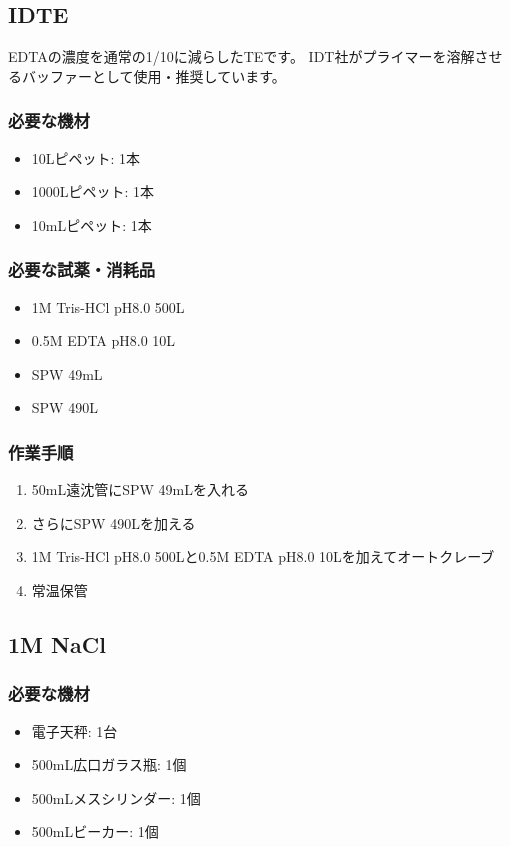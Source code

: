 \documentclass[titlepage,10pt,a4paper,uplatex]{jsbook}
\begin{document}
\subsection{IDTE}

EDTAの濃度を通常の1/10に減らしたTEです。
IDT社がプライマーを溶解させるバッファーとして使用・推奨しています。

\subsubsection{必要な機材}
\begin{itemize}
\item 10{\textmu}Lピペット: 1本
\item 1000{\textmu}Lピペット: 1本
\item 10mLピペット: 1本
\end{itemize}

\subsubsection{必要な試薬・消耗品}
\begin{itemize}
\item 1M Tris-HCl pH8.0 500{\textmu}L
\item 0.5M EDTA pH8.0 10{\textmu}L
\item SPW 49mL
\item SPW 490{\textmu}L
\end{itemize}

\subsubsection{作業手順}
\begin{enumerate}
\item 50mL遠沈管にSPW 49mLを入れる
\item さらにSPW 490{\textmu}Lを加える
\item 1M Tris-HCl pH8.0 500{\textmu}Lと0.5M EDTA pH8.0 10{\textmu}Lを加えてオートクレーブ
\item 常温保管
\end{enumerate}

\subsection{1M NaCl}

\subsubsection{必要な機材}
\begin{itemize}
\item 電子天秤: 1台
\item 500mL広口ガラス瓶: 1個
\item 500mLメスシリンダー: 1個
\item 500mLビーカー: 1個
\end{itemize}
\end{document}
